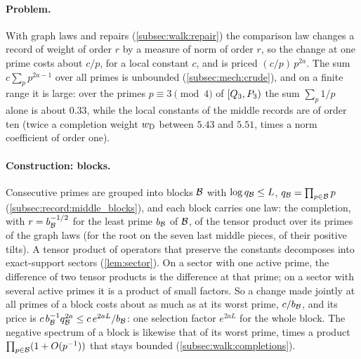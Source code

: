 \paragraph{Problem.}
With graph laws and repairs (\cref{subsec:walk:repair}) the comparison law
changes a record of weight of order $r$ by a measure of norm of order $r$, so
the change at one prime costs about $c/p$, for a local constant $c$, and is
priced $(c/p)\,p^{2a}$. The sum $c\sum_pp^{2a-1}$ over all primes is unbounded
(\cref{subsec:mech:crude}), and on a finite range it is large: over the primes
$p\equiv3\pmod4$ of $[Q_3,P_3)$ the sum $\sum_p1/p$ alone is about $0.33$,
while the local constants of the middle records are of order ten (twice a
completion weight $w_{\rm D}$ between $5.43$ and $5.51$, times a norm
coefficient of order one).

\paragraph{Construction: blocks.}
Consecutive primes are grouped into blocks $\mathcal B$ with $\log q_\mathcal B\le L$,
$q_\mathcal B=\prod_{p\in\mathcal B}p$ (\cref{subsec:record:middle_blocks}), and each
block carries one law: the completion,
with $r=b_\mathcal B^{-1/2}$ for the least prime $b_\mathcal B$ of $\mathcal B$, of the tensor
product over its primes of the graph laws (for the root on the seven last
middle pieces, of their positive tilts). A tensor product of operators that
preserve the constants
decomposes into exact-support sectors (\cref{lem:sector}). On a sector with one
active prime, the difference of two tensor products is the difference at that
prime; on a sector with several active primes it is a product of small
factors. So a change made jointly at all primes of a block costs about as much
as at its worst prime, $c/b_\mathcal B$, and its price is
$c\,b_\mathcal B^{-1}q_\mathcal B^{2a}\le c\,e^{2aL}/b_\mathcal B$: one selection factor $e^{2aL}$
for the whole block. The negative spectrum of a block is likewise that of its
worst prime, times a product $\prod_{p\in\mathcal B}(1+O(p^{-1}))$ that stays bounded
(\cref{subsec:walk:completions}).

